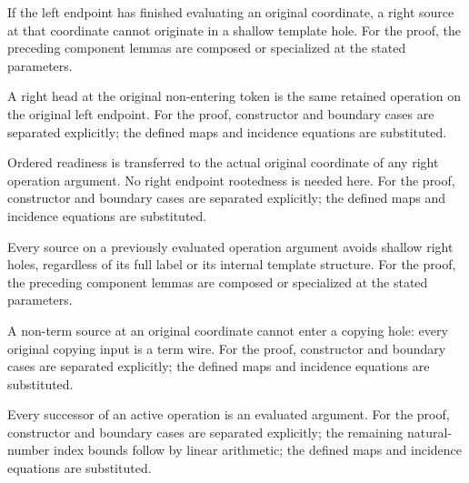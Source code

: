 If the left endpoint has finished evaluating an original coordinate, a right source at that coordinate cannot originate in a shallow template hole.
For the proof, the preceding component lemmas are composed or specialized at the stated parameters.
\par{}

A right head at the original non-entering token is the same retained operation on the original left endpoint.
For the proof, constructor and boundary cases are separated explicitly; the defined maps and incidence equations are substituted.
\par{}

Ordered readiness is transferred to the actual original coordinate of any right operation argument. No right endpoint rootedness is needed here.
For the proof, constructor and boundary cases are separated explicitly; the defined maps and incidence equations are substituted.
\par{}

Every source on a previously evaluated operation argument avoids shallow right holes, regardless of its full label or its internal template structure.
For the proof, the preceding component lemmas are composed or specialized at the stated parameters.
\par{}

A non-term source at an original coordinate cannot enter a copying hole: every original copying input is a term wire.
For the proof, constructor and boundary cases are separated explicitly; the defined maps and incidence equations are substituted.
\par{}

Every successor of an active operation is an evaluated argument.
For the proof, constructor and boundary cases are separated explicitly; the remaining natural-number index bounds follow by linear arithmetic; the defined maps and incidence equations are substituted.
\par{}

